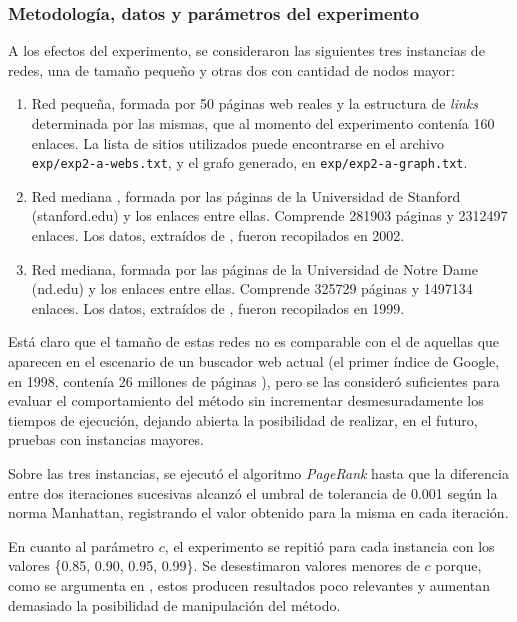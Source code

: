             \subsubsection*{Metodología, datos y parámetros del experimento}
            A los efectos del experimento, se consideraron las siguientes tres instancias de redes, una de tamaño pequeño y otras dos con cantidad de nodos mayor:
            \begin{enumerate}[label=(\alph*)]
                \item Red pequeña, formada por 50 páginas web reales y la estructura de \emph{links} determinada por las mismas, que al momento del experimento contenía 160 enlaces. La lista de sitios utilizados puede encontrarse en el archivo \texttt{exp/exp2-a-webs.txt}, y el grafo generado, en \texttt{exp/exp2-a-graph.txt}.

                \item Red mediana , formada por las páginas de la Universidad de Stanford (stanford.edu) y los enlaces entre ellas. Comprende 281903 páginas y 2312497 enlaces. Los datos, extraídos de \cite{SNAP}, fueron recopilados en 2002.

                \item Red mediana, formada por las páginas de la Universidad de Notre Dame (nd.edu) y los enlaces entre ellas. Comprende 325729 páginas y 1497134 enlaces. Los datos, extraídos de \cite{SNAP}, fueron recopilados en 1999.
            \end{enumerate}

            Está claro que el tamaño de estas redes no es comparable con el de aquellas que aparecen en el escenario de un buscador web actual (el primer índice de Google, en 1998, contenía 26 millones de páginas \cite{Brin1998}), pero se las consideró suficientes para evaluar el comportamiento del método sin incrementar desmesuradamente los tiempos de ejecución, dejando abierta la posibilidad de realizar, en el futuro, pruebas con instancias mayores.

            Sobre las tres instancias, se ejecutó el algoritmo \emph{PageRank} hasta que la diferencia entre dos iteraciones sucesivas alcanzó el umbral de tolerancia de 0.001 según la norma Manhattan, registrando el valor obtenido para la misma en cada iteración.

            En cuanto al parámetro $c$, el experimento se repitió para cada instancia con los valores \{0.85, 0.90, 0.95, 0.99\}. Se desestimaron valores menores de $c$ porque, como se argumenta en \cite{Kamvar2003}, estos producen resultados poco relevantes y aumentan demasiado la posibilidad de manipulación del método.

